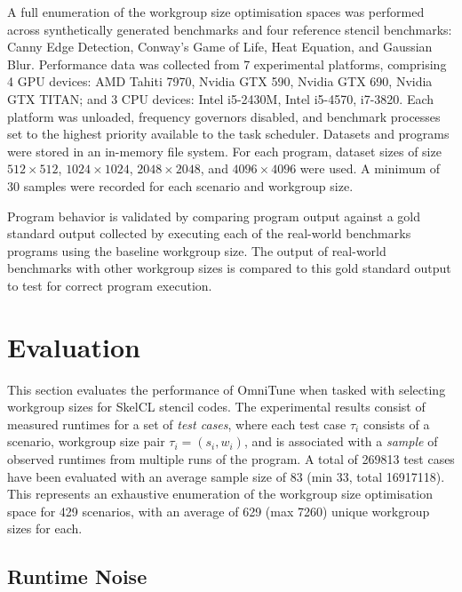 \documentclass[nonatbib,preprint,9pt]{sigplanconf}
\begin{document}
A full enumeration of the workgroup size optimisation spaces was
performed across synthetically generated benchmarks and four reference
stencil benchmarks: Canny Edge Detection, Conway's Game of Life, Heat
Equation, and Gaussian Blur. Performance data was collected from 7
experimental platforms, comprising 4 GPU devices: AMD Tahiti 7970,
Nvidia GTX 590, Nvidia GTX 690, Nvidia GTX TITAN; and 3 CPU devices:
Intel i5-2430M, Intel i5-4570, i7-3820. Each platform was unloaded,
frequency governors disabled, and benchmark processes set to the
highest priority available to the task scheduler. Datasets and
programs were stored in an in-memory file system. For each program,
dataset sizes of size $512\times512$, $1024\times1024$,
$2048\times2048$, and $4096\times4096$ were used. A minimum of 30
samples were recorded for each scenario and workgroup size.

Program behavior is validated by comparing program output against a
gold standard output collected by executing each of the real-world
benchmarks programs using the baseline workgroup size. The output of
real-world benchmarks with other workgroup sizes is compared to this
gold standard output to test for correct program execution.


\section{Evaluation}\label{sec:evaluation}

This section evaluates the performance of OmniTune when tasked with
selecting workgroup sizes for SkelCL stencil codes. The experimental
results consist of measured runtimes for a set of \emph{test cases},
where each test case $\tau_i$ consists of a scenario, workgroup size
pair $\tau_i = (s_i,w_i)$, and is associated with a \emph{sample} of
observed runtimes from multiple runs of the program. A total of 269813
test cases have been evaluated with an average sample size of 83 (min
33, total 16917118). This represents an exhaustive enumeration of the
workgroup size optimisation space for 429 scenarios, with an average
of 629 (max 7260) unique workgroup sizes for each.


\subsection{Runtime Noise}
\end{document}
